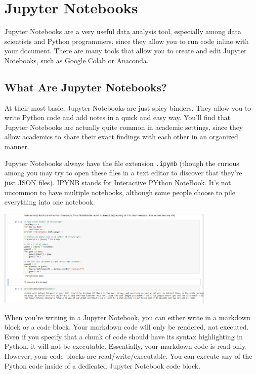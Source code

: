 \chapter{Jupyter Notebooks}
Jupyter Notebooks are a very useful data analysis tool, especially among data scientists and Python programmers, since they allow you to run code inline with your document. There are many tools that allow you to create and edit Jupyter Notebooks, such as Google Colab or Anaconda.\par
\section{What Are Jupyter Notebooks?}
At their most basic, Jupyter Notebooks are just spicy binders. They allow you to write Python code and add notes in a quick and easy way. You'll find that Jupyter Notebooks are actually quite common in academic settings, since they allow academics to share their exact findings with each other in an organized manner. \par
Jupyter Notebooks always have the file extension \verb|.ipynb| (though the curious among you may try to open these files in a text editor to discover that they're just JSON files). IPYNB stands for Interactive PYthon NoteBook. It's not uncommon to have multiple notebooks, although some people choose to pile everything into one notebook.\par

\includegraphics[width=0.8\textwidth]{img/jupyternotebook.png}

When you're writing in a Jupyter Notebook, you can either write in a markdown block or a code block. Your markdown code will only be rendered, not executed. Even if you specify that a chunk of code should have its syntax highlighting in Python, it will not be executable. Essentially, your markdown code is read-only. However, your code blocks are read/write/executable. You can execute any of the Python code inside of a dedicated Jupyter Notebook code block.\par
